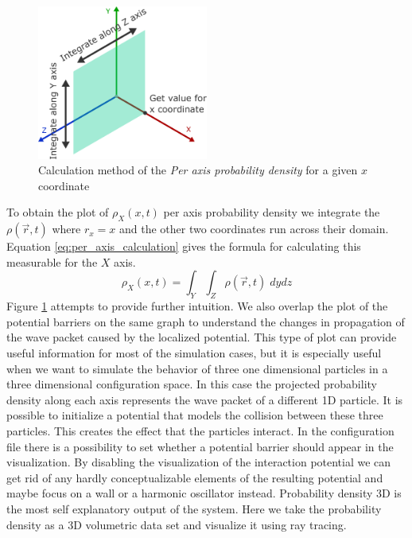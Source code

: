 \begin{figure}
	\centering
	\includegraphics[width=0.5\textwidth]{figures/per_axis_plot_explained.pdf}
	\caption{Calculation method of the \textit{Per axis probability density} for a given $x$ coordinate}
	\label{fig:per_axis_explained}
\end{figure}
To obtain the plot of $\rho_X(x, t)$ per axis probability density we integrate the $\rho(\vec{r}, t)$ where $r_x = x$ and the other two coordinates run across their domain.
Equation \ref{eq:per_axis_calculation} gives the formula for calculating this measurable for the $X$ axis.
\begin{equation}
	\rho_X(x, t) = \int_Y \int_Z \rho(\vec{r}, t)\; dy dz
	\label{eq:per_axis_calculation}
\end{equation}
Figure \ref{fig:per_axis_explained} attempts to provide further intuition.
We also overlap the plot of the potential barriers on the same graph to understand the changes in propagation of the wave packet caused by the localized potential.
This type of plot can provide useful information for most of the simulation cases, but it is especially useful when we want to simulate the behavior of three one dimensional particles in a three dimensional configuration space.
In this case the projected probability density along each axis represents the wave packet of a different 1D particle.
It is possible to initialize a potential that models the collision between these three particles.
This creates the effect that the particles interact.
In the configuration file there is a possibility to set whether a potential barrier should appear in the visualization.
By disabling the visualization of the interaction potential we can get rid of any hardly conceptualizable elements of the resulting potential and maybe focus on a wall or a harmonic oscillator instead.
Probability density 3D is the most self explanatory output of the system.
Here we take the probability density as a 3D volumetric data set and visualize it using ray tracing.
